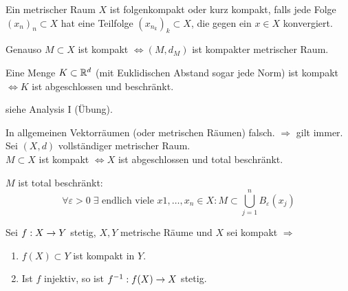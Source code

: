\documentclass[../ana2.tex]{subfiles}
\begin{document}
\begin{defi}[Folgenkompakt]
    Ein metrischer Raum \( X \) ist folgenkompakt oder kurz kompakt, 
    falls jede Folge \((x_n)_n \subset X \) hat eine Teilfolge
    \( (x_{n_k})_k \subset X \), die gegen ein \( x \in X \) konvergiert. 
\end{defi}
\begin{bem}
    Genauso \(M \subset X\) ist kompakt \( \Leftrightarrow (M, d_M) \) ist
    kompakter metrischer Raum. 
\end{bem}
\begin{satz}
    Eine Menge \( K \subset \mathbb{R}^d \) (mit Euklidischen Abstand sogar jede
    Norm) ist kompakt \( \Leftrightarrow K \) ist abgeschlossen und
    beschränkt.
\end{satz}
\begin{bew}
    siehe Analysis I (Übung).
\end{bew}
\begin{bem}
    In allgemeinen Vektorräumen (oder metrischen Räumen) falsch.
    \( \Rightarrow \) gilt immer.\\
    Sei \((X, d)\) vollständiger metrischer Raum. \\
    \(M \subset X\) ist kompakt \(\Leftrightarrow X\) ist abgeschlossen
    und total beschränkt.
\end{bem}
\begin{defi*}
    \(M\) ist total beschränkt: 
    \[ \forall \varepsilon > 0 \; 
    \exists \text{ endlich viele } x1,\dots,x_n \in X:
    M \subset \bigcup_{j=1}^n B_\varepsilon(x_j) \]
\end{defi*}
\begin{kor}
    Sei \( f:X\rightarrow Y \) stetig, \( X, Y \) metrische Räume
    und \(X\) sei kompakt
    \( \Rightarrow \)
    \begin{enumerate}
        \item \( f(X) \subset Y \) ist kompakt in \( Y \).
        \item Ist \(f\) injektiv, so ist \( f^{-1}:f(X)\rightarrow X \)
        stetig.
    \end{enumerate}
\end{kor}
\end{document}
